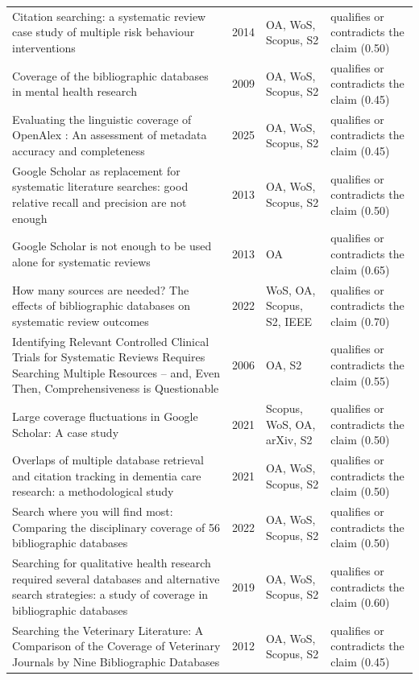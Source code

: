 \begin{longtable}{@{}%
  >{\raggedright\arraybackslash}p{}c%
  >{\raggedright\arraybackslash}p{}%
  >{\raggedright\arraybackslash}p{}@{}}
Citation searching: a systematic review case study of multiple risk behaviour interventions & 2014 & OA, WoS, Scopus, S2 & qualifies or contradicts the claim (0.50) \\
Coverage of the bibliographic databases in mental health research & 2009 & OA, WoS, Scopus, S2 & qualifies or contradicts the claim (0.45) \\
Evaluating the linguistic coverage of OpenAlex : An assessment of metadata accuracy and completeness & 2025 & OA, WoS, Scopus, S2 & qualifies or contradicts the claim (0.45) \\
Google Scholar as replacement for systematic literature searches: good relative recall and precision are not enough & 2013 & OA, WoS, Scopus, S2 & qualifies or contradicts the claim (0.50) \\
Google Scholar is not enough to be used alone for systematic reviews & 2013 & OA & qualifies or contradicts the claim (0.65) \\
How many sources are needed? The effects of bibliographic databases on systematic review outcomes & 2022 & WoS, OA, Scopus, S2, IEEE & qualifies or contradicts the claim (0.70) \\
Identifying Relevant Controlled Clinical Trials for Systematic Reviews Requires Searching Multiple Resources -- and, Even Then, Comprehensiveness is Questionable & 2006 & OA, S2 & qualifies or contradicts the claim (0.55) \\
Large coverage fluctuations in Google Scholar: A case study & 2021 & Scopus, WoS, OA, arXiv, S2 & qualifies or contradicts the claim (0.50) \\
Overlaps of multiple database retrieval and citation tracking in dementia care research: a methodological study & 2021 & OA, WoS, Scopus, S2 & qualifies or contradicts the claim (0.50) \\
Search where you will find most: Comparing the disciplinary coverage of 56 bibliographic databases & 2022 & OA, WoS, Scopus, S2 & qualifies or contradicts the claim (0.50) \\
Searching for qualitative health research required several databases and alternative search strategies: a study of coverage in bibliographic databases & 2019 & OA, WoS, Scopus, S2 & qualifies or contradicts the claim (0.60) \\
Searching the Veterinary Literature: A Comparison of the Coverage of Veterinary Journals by Nine Bibliographic Databases & 2012 & OA, WoS, Scopus, S2 & qualifies or contradicts the claim (0.45) \\

\end{longtable}
